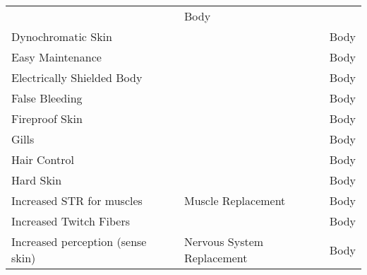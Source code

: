 \documentclass[twoside]{book}
\begin{document}
\begin{longtable}{p{1.25in}p{2em}ll}
  &
  
  &
   Body 
  \tabularnewline
      
  \raggedright
           Dynochromatic Skin 
  &
  
  &
  
  &
   Body 
  \tabularnewline
      
  \raggedright
           Easy Maintenance 
  &
  
  &
  
  &
   Body 
  \tabularnewline
      
  \raggedright
           Electrically Shielded Body
           
  &
  
  &
  
  &
   Body 
  \tabularnewline
      
  \raggedright
           False Bleeding 
  &
  
  &
  
  &
   Body 
  \tabularnewline
      
  \raggedright
           Fireproof Skin 
  &
  
  &
  
  &
   Body 
  \tabularnewline
      
  \raggedright
           Gills 
  &
  
  &
  
  &
   Body 
  \tabularnewline
      
  \raggedright
           Hair Control 
  &
  
  &
  
  &
   Body 
  \tabularnewline
      
  \raggedright
           Hard Skin 
  &
  
  &
  
  &
   Body 
  \tabularnewline
      
  \raggedright
           Increased STR for muscles
           
  &
  
  &
   Muscle Replacement
           
  &
   Body 
  \tabularnewline
      
  \raggedright
           Increased Twitch Fibers
           
  &
  
  &
  
  &
   Body 
  \tabularnewline
      
  \raggedright
           Increased perception (sense
           skin) 
  &
  
  &
   Nervous System
           Replacement 
  &
   Body 
  \tabularnewline
      

\end{longtable}
\end{document}
